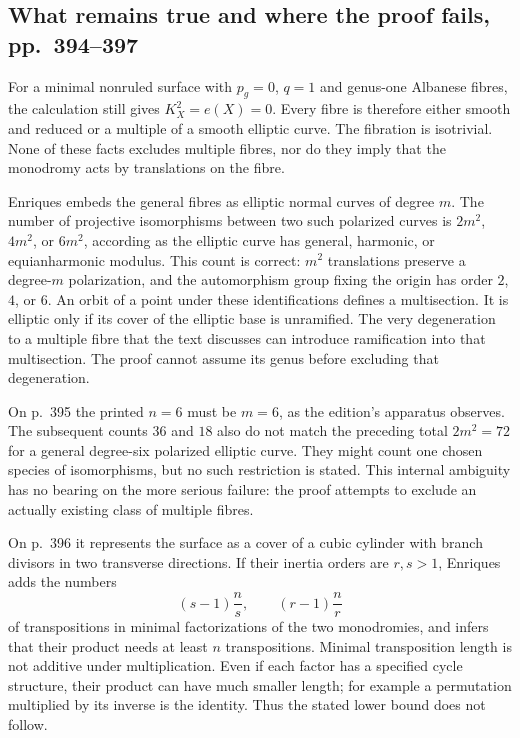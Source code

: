 \subsection{What remains true and where the proof fails, pp.~394--397}

For a minimal nonruled surface with $p_g=0$, $q=1$ and genus-one Albanese fibres, the calculation still gives $K_X^2=e(X)=0$. Every fibre is therefore either smooth and reduced or a multiple of a smooth elliptic curve. The fibration is isotrivial. None of these facts excludes multiple fibres, nor do they imply that the monodromy acts by translations on the fibre.

Enriques embeds the general fibres as elliptic normal curves of degree $m$. The number of projective isomorphisms between two such polarized curves is $2m^2$, $4m^2$, or $6m^2$, according as the elliptic curve has general, harmonic, or equianharmonic modulus. This count is correct: $m^2$ translations preserve a degree-$m$ polarization, and the automorphism group fixing the origin has order $2$, $4$, or $6$. An orbit of a point under these identifications defines a multisection. It is elliptic only if its cover of the elliptic base is unramified. The very degeneration to a multiple fibre that the text discusses can introduce ramification into that multisection. The proof cannot assume its genus before excluding that degeneration.

On p.~395 the printed $n=6$ must be $m=6$, as the edition's apparatus observes. The subsequent counts $36$ and $18$ also do not match the preceding total $2m^2=72$ for a general degree-six polarized elliptic curve. They might count one chosen species of isomorphisms, but no such restriction is stated. This internal ambiguity has no bearing on the more serious failure: the proof attempts to exclude an actually existing class of multiple fibres.

On p.~396 it represents the surface as a cover of a cubic cylinder with branch divisors in two transverse directions. If their inertia orders are $r,s>1$, Enriques adds the numbers
\[
 (s-1)\frac ns,\qquad(r-1)\frac nr
\]
of transpositions in minimal factorizations of the two monodromies, and infers that their product needs at least $n$ transpositions. Minimal transposition length is not additive under multiplication. Even if each factor has a specified cycle structure, their product can have much smaller length; for example a permutation multiplied by its inverse is the identity. Thus the stated lower bound does not follow.

